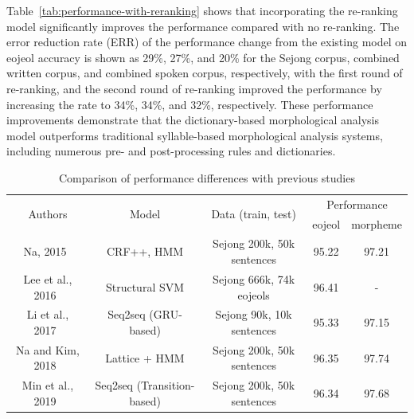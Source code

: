 \documentclass[AMS,STIX2COL]{WileyNJD-v2}
\begin{document}
    Table~\ref{tab:performance-with-reranking} shows that incorporating the re-ranking model significantly improves the performance compared with no re-ranking. The error reduction rate (ERR) of the performance change from the existing model on eojeol accuracy is shown as 29\%, 27\%, and 20\% for the Sejong corpus, combined written corpus, and combined spoken corpus, respectively, with the first round of re-ranking, and the second round of re-ranking improved the performance by increasing the rate to 34\%, 34\%, and 32\%, respectively.
    These performance improvements demonstrate that the dictionary-based morphological analysis model outperforms traditional syllable-based morphological analysis systems, including numerous pre- and post-processing rules and dictionaries.

    \begin{table}[]
        \caption{Comparison of performance differences with previous studies}\label{tab:differences-with-previous-studies}
        \begin{tabular*}{500pt}{@{\extracolsep\fill}ccc|cc@{\extracolsep\fill}}
            \toprule
            \multirow{2}{*}{Authors} & \multirow{2}{*}{Model} & \multirow{2}{*}{Data (train, test)} & \multicolumn{2}{c}{Performance} \\
            \cmidrule{4-5}
            ~                                     & ~                                          & ~                                           & \multicolumn{1}{c}{eojeol} & \multicolumn{1}{c}{morpheme} \\
            \midrule
            Na, 2015~\cite{NaSH2015}              & CRF++, HMM                                 & Sejong 200k, 50k sentences                  & 95.22                      & 97.21                        \\
            Lee et al., 2016~\cite{LeeCH2016}     & Structural SVM                             & Sejong 666k, 74k eojeols                    & 96.41                      & -                            \\
            Li et al., 2017~\cite{Li2017}         & Seq2seq (GRU-based)                        & Sejong 90k, 10k sentences                   & 95.33                      & 97.15                        \\
            Na and Kim, 2018~\cite{NaSH2018}      & Lattice + HMM                              & Sejong 200k, 50k sentences                  & 96.35                      & 97.74                        \\
            Min et al., 2019~\cite{MinJW2019}     & Seq2seq (Transition-based)                 & Sejong 200k, 50k sentences                  & 96.34                      & 97.68                        \\

\end{tabular*}
\end{table}
\end{document}
